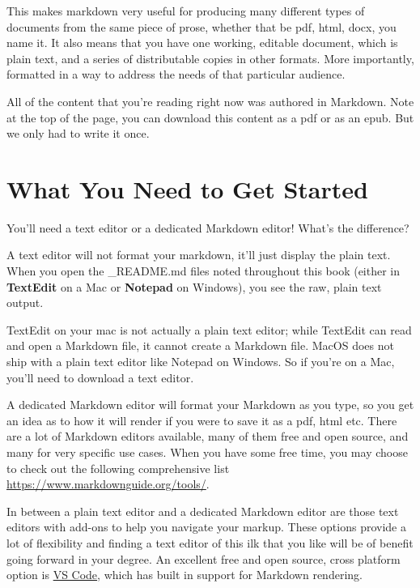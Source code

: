 \documentclass[
]{book}
\begin{document}
This makes markdown very useful for producing many different types of documents from the same piece of prose, whether that be pdf, html, docx, you name it. It also means that you have one working, editable document, which is plain text, and a series of distributable copies in other formats. More importantly, formatted in a way to address the needs of that particular audience.

All of the content that you're reading right now was authored in Markdown. Note at the top of the page, you can download this content as a pdf or as an epub. But we only had to write it once.

\hypertarget{what-you-need-to-get-started}{%
\section{What You Need to Get Started}\label{what-you-need-to-get-started}}

You'll need a text editor or a dedicated Markdown editor! What's the difference?

A text editor will not format your markdown, it'll just display the plain text. When you open the \_README.md files noted throughout this book (either in \textbf{TextEdit} on a Mac or \textbf{Notepad} on Windows), you see the raw, plain text output.

TextEdit on your mac is not actually a plain text editor; while TextEdit can read and open a Markdown file, it cannot create a Markdown file. MacOS does not ship with a plain text editor like Notepad on Windows. So if you're on a Mac, you'll need to download a text editor.

A dedicated Markdown editor will format your Markdown as you type, so you get an idea as to how it will render if you were to save it as a pdf, html etc. There are a lot of Markdown editors available, many of them free and open source, and many for very specific use cases. When you have some free time, you may choose to check out the following comprehensive list \url{https://www.markdownguide.org/tools/}.

In between a plain text editor and a dedicated Markdown editor are those text editors with add-ons to help you navigate your markup. These options provide a lot of flexibility and finding a text editor of this ilk that you like will be of benefit going forward in your degree. An excellent free and open source, cross platform option is \href{https://code.visualstudio.com/}{VS Code}, which has built in support for Markdown rendering.
\end{document}
